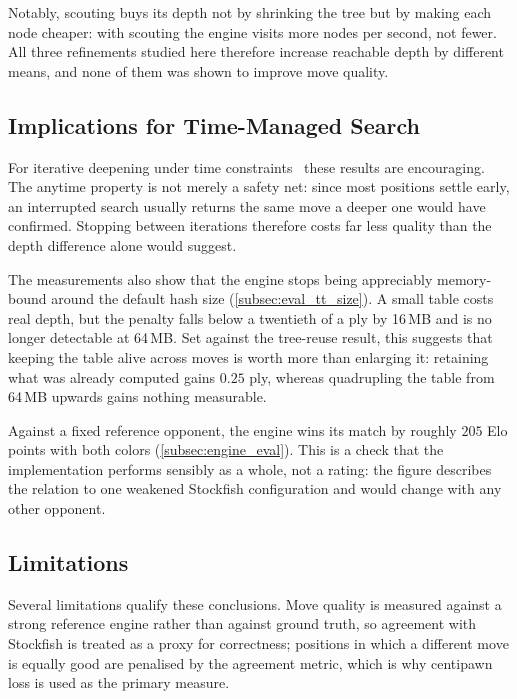 Notably, scouting buys its depth not by shrinking the tree but by making each node
cheaper: with scouting the engine visits more nodes per second, not fewer. All
three refinements studied here therefore increase reachable depth by different
means, and none of them was shown to improve move quality.

\subsection{Implications for Time-Managed Search}
\label{subsec:discussion_time}

For iterative deepening under time constraints~\cite{korf1985iterative} these
results are encouraging. The anytime property is not merely a safety net: since
most positions settle early, an interrupted search usually returns the same move
a deeper one would have confirmed. Stopping between iterations therefore costs
far less quality than the depth difference alone would suggest.

The measurements also show that the engine stops being appreciably memory-bound
around the default hash size (\cref{subsec:eval_tt_size}). A small table costs
real depth, but the penalty falls below a twentieth of a ply by 16\,MB and is no
longer detectable at 64\,MB. Set against the tree-reuse result, this suggests that
keeping the table alive across moves is worth more than enlarging it: retaining
what was already computed gains $0.25$ ply, whereas quadrupling the table from
64\,MB upwards gains nothing measurable.

Against a fixed reference opponent, the engine wins its match by roughly $205$
Elo points with both colors (\cref{subsec:engine_eval}). This is a check that the
implementation performs sensibly as a whole, not a rating: the figure describes
the relation to one weakened Stockfish configuration and would change with any
other opponent.

\subsection{Limitations}
\label{subsec:discussion_limitations}

Several limitations qualify these conclusions. Move quality is measured against a
strong reference engine rather than against ground truth, so agreement with
Stockfish is treated as a proxy for correctness; positions in which a different
move is equally good are penalised by the agreement metric, which is why
centipawn loss is used as the primary measure.


